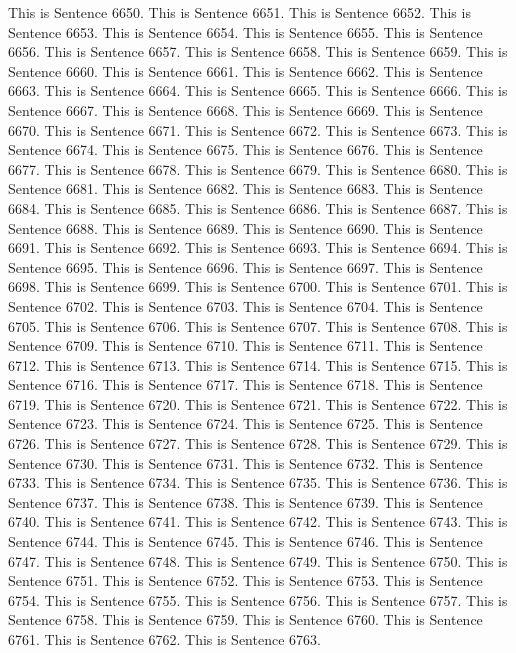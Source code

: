 \documentclass{article}
\begin{document}
This is Sentence 6650.
This is Sentence 6651.
This is Sentence 6652.
This is Sentence 6653.
This is Sentence 6654.
This is Sentence 6655.
This is Sentence 6656.
This is Sentence 6657.
This is Sentence 6658.
This is Sentence 6659.
This is Sentence 6660.
This is Sentence 6661.
This is Sentence 6662.
This is Sentence 6663.
This is Sentence 6664.
This is Sentence 6665.
This is Sentence 6666.
This is Sentence 6667.
This is Sentence 6668.
This is Sentence 6669.
This is Sentence 6670.
This is Sentence 6671.
This is Sentence 6672.
This is Sentence 6673.
This is Sentence 6674.
This is Sentence 6675.
This is Sentence 6676.
This is Sentence 6677.
This is Sentence 6678.
This is Sentence 6679.
This is Sentence 6680.
This is Sentence 6681.
This is Sentence 6682.
This is Sentence 6683.
This is Sentence 6684.
This is Sentence 6685.
This is Sentence 6686.
This is Sentence 6687.
This is Sentence 6688.
This is Sentence 6689.
This is Sentence 6690.
This is Sentence 6691.
This is Sentence 6692.
This is Sentence 6693.
This is Sentence 6694.
This is Sentence 6695.
This is Sentence 6696.
This is Sentence 6697.
This is Sentence 6698.
This is Sentence 6699.
This is Sentence 6700.
This is Sentence 6701.
This is Sentence 6702.
This is Sentence 6703.
This is Sentence 6704.
This is Sentence 6705.
This is Sentence 6706.
This is Sentence 6707.
This is Sentence 6708.
This is Sentence 6709.
This is Sentence 6710.
This is Sentence 6711.
This is Sentence 6712.
This is Sentence 6713.
This is Sentence 6714.
This is Sentence 6715.
This is Sentence 6716.
This is Sentence 6717.
This is Sentence 6718.
This is Sentence 6719.
This is Sentence 6720.
This is Sentence 6721.
This is Sentence 6722.
This is Sentence 6723.
This is Sentence 6724.
This is Sentence 6725.
This is Sentence 6726.
This is Sentence 6727.
This is Sentence 6728.
This is Sentence 6729.
This is Sentence 6730.
This is Sentence 6731.
This is Sentence 6732.
This is Sentence 6733.
This is Sentence 6734.
This is Sentence 6735.
This is Sentence 6736.
This is Sentence 6737.
This is Sentence 6738.
This is Sentence 6739.
This is Sentence 6740.
This is Sentence 6741.
This is Sentence 6742.
This is Sentence 6743.
This is Sentence 6744.
This is Sentence 6745.
This is Sentence 6746.
This is Sentence 6747.
This is Sentence 6748.
This is Sentence 6749.
This is Sentence 6750.
This is Sentence 6751.
This is Sentence 6752.
This is Sentence 6753.
This is Sentence 6754.
This is Sentence 6755.
This is Sentence 6756.
This is Sentence 6757.
This is Sentence 6758.
This is Sentence 6759.
This is Sentence 6760.
This is Sentence 6761.
This is Sentence 6762.
This is Sentence 6763.
\end{document}
